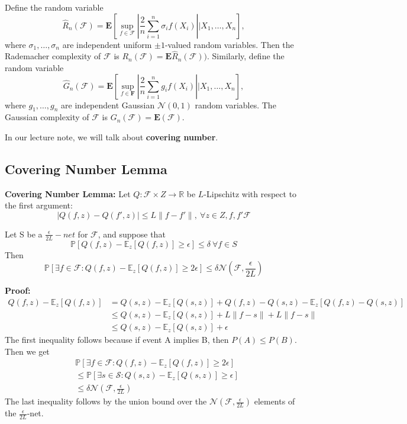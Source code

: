 \documentclass{article}[12pt]
\begin{document}
Define the random variable
\begin{equation*}
    \hat R_n(\mathcal{F}) = \textbf{E}[\sup_{f \in \mathcal{F}} |\frac{2}{n}\sum_{i=1}^n \sigma_i f(X_i)| | X_1, \ldots, X_n],
\end{equation*}where $\sigma_1, \ldots, \sigma_n$ are independent uniform ${\pm1}$-valued random variables. Then the Rademacher complexity of $\mathcal{F}$ is $R_n(\mathcal{F})=\textbf{E}\hat R_n(\mathcal{F}))$. Similarly, define the random variable
\begin{equation*}
    \hat G_n(\mathcal{F}) = \textbf{E}[\sup_{f \in \mathbf{F}} |\frac{2}{n}\sum_{i=1}^n g_i f(X_i)| | X_1, \ldots, X_n], 
\end{equation*}where $g_1, \ldots, g_n$ are independent Gaussian $\mathcal{N}(0,1)$ random variables. The Gaussian complexity of $\mathcal{F}$ is $G_n(\mathcal{F})=\textbf{E}(\mathcal{F})$.

In our lecture note, we will talk about \textbf{covering number}.

\subsection{Covering Number Lemma}
\textbf{Covering Number Lemma:}
Let $Q: \mathcal{F} \times Z \rightarrow \mathbb{R}$ be $L$-Lipschitz with respect to the first argument:
\begin{equation}
    |Q(f,z)-Q(f', z)| \leq L\|f-f'\|, \ \forall z \in Z, f, f' \mathcal{F}
\end{equation}

Let S be a $\frac{\epsilon}{2L}-net$ for $\mathcal{F}$, and suppose that 
\begin{equation}
    \mathbb{P}[Q(f,z)-\mathbb{E}_z[Q(f,z)]\geq \epsilon]\leq \delta \ \forall f \in S
\end{equation}
Then 
\begin{equation}
    \mathbb{P}[\exists f \in \mathcal{F}: Q(f,z)-\mathbb{E}_z[Q(f,z)]\geq 2\epsilon] \leq \delta \mathcal{N}(\mathcal{F}, \frac{\epsilon}{2L})
\end{equation}

\textbf{Proof:}
\begin{align*}
    Q(f,z) - \mathbb{E}_z[Q(f,z)] &= Q(s,z) - \mathbb{E}_z[Q(s,z)] + Q(f,z) - Q(s,z) - \mathbb{E}_z[Q(f,z)-Q(s,z)]\\
    &\leq Q(s,z) - \mathbb{E}_z[Q(s,z)] + L \|f-s\| + L \|f-s\|\\
    &\leq Q(s,z) - \mathbb{E}_z[Q(s,z)] + \epsilon
\end{align*}
The first inequality follows because if event A implies B, then $P(A) \leq P(B)$. Then we get
\begin{align*}
    &\mathbb{P}[\exists f \in \mathcal{F} : Q(f,z) - \mathbb{E}_z[Q(f,z)]\geq 2 \epsilon]\\
    &\leq \mathbb{P}[\exists s \in \mathcal{S} : Q(s,z) - \mathbb{E}_z[Q(s,z)]\geq \epsilon]\\
    &\leq \delta \mathcal{N}(\mathcal{F}, \frac{\epsilon}{2L})
\end{align*}
The last inequality follows by the union bound over the $\mathcal{N}(\mathcal{F},\frac{\epsilon}{2L})$ elements of the $\frac{\epsilon}{2L}$-net.
\end{document}
